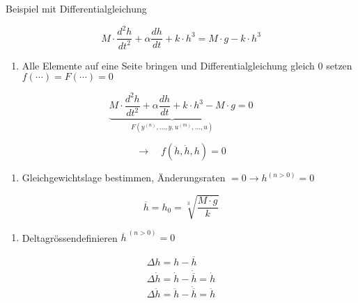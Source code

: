 \documentclass[
  10pt,
  a4paper,
  twocolumn]{article}
\providecommand{\tightlist}{%
  \setlength{\itemsep}{0pt}\setlength{\parskip}{0pt}}\usepackage{longtable,booktabs,array}
\numberwithin{equation}{section}
\begin{document}
\begin{tcolorbox}[enhanced jigsaw, coltitle=black, colback=white, breakable, colframe=quarto-callout-tip-color-frame, rightrule=.15mm, left=2mm, opacityback=0, leftrule=.75mm, toptitle=1mm, colbacktitle=quarto-callout-tip-color!10!white, bottomtitle=1mm, arc=.35mm, bottomrule=.15mm, title=\textcolor{quarto-callout-tip-color}{\faLightbulb}\hspace{0.5em}{Vorgehen}, titlerule=0mm, toprule=.15mm, opacitybacktitle=0.6]

Beispiel mit Differentialgleichung

\[
M\cdot \frac{d^2h}{dt^2}+\alpha\frac{dh}{dt}+k\cdot h^3 = M\cdot g-k\cdot h^3
\]

\small

\begin{enumerate}
\def\labelenumi{\arabic{enumi}.}
\tightlist
\item
  Alle Elemente auf eine Seite bringen und Differentialgleichung gleich
  \(0\) setzen \(f(\cdots)=F(\cdots)=0\)
\end{enumerate}

\normalsize

\[
\underbrace{M\cdot \frac{d^2h}{dt^2}+\alpha\frac{dh}{dt}+k\cdot h^3 - M\cdot g}_{F(y^{(n)},\ldots,y,u^{(m)},\ldots,u)}=0
\]

\[
\rightarrow\quad f(\ddot{h}, \dot{h}, h)= 0
\]

\small

\begin{enumerate}
\def\labelenumi{\arabic{enumi}.}
\setcounter{enumi}{1}
\tightlist
\item
  Gleichgewichtslage bestimmen, Änderungsraten
  \(=0\rightarrow h^{(n>0)}=0\)
\end{enumerate}

\normalsize

\[
\overline{h}=h_0=\sqrt[3]{\frac{M\cdot g}{k}}
\]

\small

\begin{enumerate}
\def\labelenumi{\arabic{enumi}.}
\setcounter{enumi}{2}
\tightlist
\item
  Deltagrössendefinieren \(\overline{h}^{\ (n>0)}=0\) \normalsize
\end{enumerate}

\[
\begin{array}{l}
\Delta h = h-\overline{h} \\
\Delta \dot{h} = \dot{h} - \dot{\overline{h}} = \dot{h}\\
\Delta \ddot{h} = \ddot{h} - \ddot{\overline{h}} = \ddot{h} \\
\end{array}
\]


\end{tcolorbox}
\end{document}
